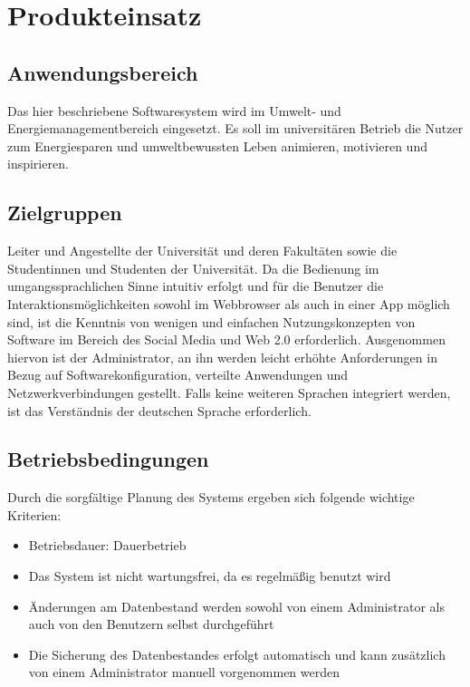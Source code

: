 \section{Produkteinsatz}
\subsection{Anwendungsbereich}
Das hier beschriebene Softwaresystem wird im Umwelt- und Energiemanagementbereich eingesetzt. Es soll im universitären Betrieb die Nutzer zum Energiesparen und umweltbewussten Leben animieren, motivieren und inspirieren. 
\subsection{Zielgruppen}
Leiter und Angestellte der Universität und deren Fakultäten sowie die Studentinnen und Studenten der Universität. 
Da die Bedienung im umgangssprachlichen Sinne intuitiv erfolgt und für die Benutzer die Interaktionsmöglichkeiten sowohl im Webbrowser als auch in einer App möglich sind, ist die Kenntnis von wenigen und einfachen Nutzungskonzepten von Software im Bereich des Social Media und Web 2.0 erforderlich. Ausgenommen hiervon ist der Administrator, an ihn werden leicht erhöhte Anforderungen in Bezug auf Softwarekonfiguration, verteilte Anwendungen und Netzwerkverbindungen gestellt. 
Falls keine weiteren Sprachen integriert werden, ist das Verständnis der deutschen Sprache erforderlich. 
\subsection{Betriebsbedingungen}
Durch die sorgfältige Planung des Systems ergeben sich folgende wichtige Kriterien: 
\begin{itemize}
\item Betriebsdauer: Dauerbetrieb 
\item Das System ist nicht wartungsfrei, da es regelmäßig benutzt wird 
\item Änderungen am Datenbestand werden sowohl von einem Administrator als auch von den Benutzern selbst durchgeführt 
\item Die Sicherung des Datenbestandes erfolgt automatisch und kann zusätzlich von einem Administrator manuell vorgenommen werden
\end{itemize}